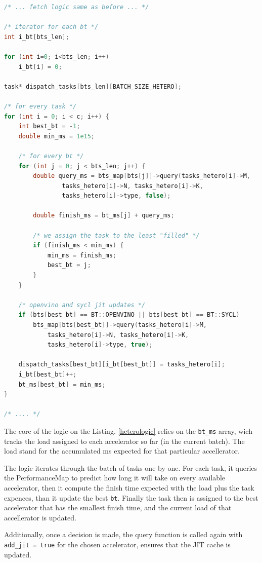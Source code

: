 \begin{lstlisting}[caption={Static Hetero Logic}, language=C++, label={heterologic}] 
/* ... fetch logic same as before ... */

/* iterator for each bt */ 
int i_bt[bts_len];

for (int i=0; i<bts_len; i++)
    i_bt[i] = 0;

task* dispatch_tasks[bts_len][BATCH_SIZE_HETERO];

/* for every task */
for (int i = 0; i < c; i++) {
    int best_bt = -1;
    double min_ms = 1e15;

    /* for every bt */
    for (int j = 0; j < bts_len; j++) {
        double query_ms = bts_map[bts[j]]->query(tasks_hetero[i]->M, 
                tasks_hetero[i]->N, tasks_hetero[i]->K, 
                tasks_hetero[i]->type, false);

        double finish_ms = bt_ms[j] + query_ms;

        /* we assign the task to the least "filled" */
        if (finish_ms < min_ms) {
            min_ms = finish_ms;
            best_bt = j;
        }
    }

    /* openvino and sycl jit updates */
    if (bts[best_bt] == BT::OPENVINO || bts[best_bt] == BT::SYCL)
        bts_map[bts[best_bt]]->query(tasks_hetero[i]->M, 
            tasks_hetero[i]->N, tasks_hetero[i]->K, 
            tasks_hetero[i]->type, true);

    dispatch_tasks[best_bt][i_bt[best_bt]] = tasks_hetero[i];
    i_bt[best_bt]++;
    bt_ms[best_bt] = min_ms;
}

/* .... */
\end{lstlisting}

The core of the logic on the Listing. \ref{heterologic} relies on the \texttt{bt\_ms} array, wich tracks the load assigned to each accelerator so far (in the current batch). The load stand for the accumulated ms expected for that particular accellerator. 

The logic iterates through the batch of tasks one by one. For each task, it queries the PerformanceMap to predict how long it will take on every available accelerator, then it compute the finish time expected with the load plus the task expences, than it update the best \texttt{bt}. Finally the task then is assigned to the best accelerator that has the smallest finish time, and the current load of that accellerator is updated.  

Additionally, once a decision is made, the query function is called again with \texttt{add\_jit = true} for the chosen accelerator, ensures that the JIT cache is updated.

